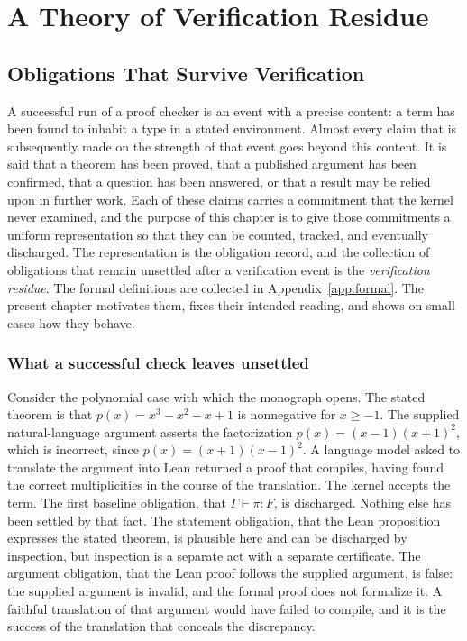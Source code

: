 \part{A Theory of Verification Residue}

\chapter{Obligations That Survive Verification}
\label{ch:obligations}

A successful run of a proof checker is an event with a precise content: a term has been found to inhabit a type in a stated environment. Almost every claim that is subsequently made on the strength of that event goes beyond this content. It is said that a theorem has been proved, that a published argument has been confirmed, that a question has been answered, or that a result may be relied upon in further work. Each of these claims carries a commitment that the kernel never examined, and the purpose of this chapter is to give those commitments a uniform representation so that they can be counted, tracked, and eventually discharged. The representation is the obligation record, and the collection of obligations that remain unsettled after a verification event is the \emph{verification residue}. The formal definitions are collected in Appendix~\ref{app:formal}. The present chapter motivates them, fixes their intended reading, and shows on small cases how they behave.

\section{What a successful check leaves unsettled}

Consider the polynomial case with which the monograph opens. The stated theorem is that $p(x) = x^3 - x^2 - x + 1$ is nonnegative for $x \ge -1$. The supplied natural-language argument asserts the factorization $p(x) = (x-1)(x+1)^2$, which is incorrect, since $p(x) = (x+1)(x-1)^2$. A language model asked to translate the argument into Lean returned a proof that compiles, having found the correct multiplicities in the course of the translation. The kernel accepts the term. The first baseline obligation, that $\Gamma \vdash \pi : F$, is discharged. Nothing else has been settled by that fact. The statement obligation, that the Lean proposition expresses the stated theorem, is plausible here and can be discharged by inspection, but inspection is a separate act with a separate certificate. The argument obligation, that the Lean proof follows the supplied argument, is false: the supplied argument is invalid, and the formal proof does not formalize it. A faithful translation of that argument would have failed to compile, and it is the success of the translation that conceals the discrepancy.

